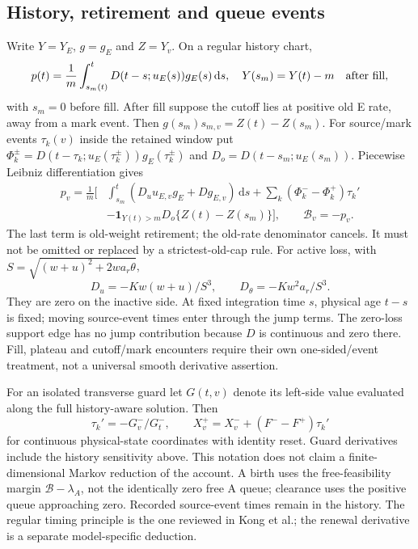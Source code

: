 \documentclass[11pt,a4paper]{article}
\newcommand{\dd}{\,\mathrm d}
\newcommand{\Bud}{\mathcal B}
\begin{document}
\subsection{History, retirement and queue events}
Write $Y=Y_E$, $g=g_E$ and $Z=Y_v$. On a regular history chart,
\begin{equation}
 p(t)=\frac1m\int_{s_m(t)}^tD(t-s;u_E(s))g_E(s)\dd s,
 \quad Y(s_m)=Y(t)-m\quad\hbox{after fill},
 \label{eq:history}
\end{equation}
with $s_m=0$ before fill. After fill suppose the cutoff lies at positive
old E rate, away from a mark event. Then
$g(s_m)s_{m,v}=Z(t)-Z(s_m)$. For source/mark events $\tau_k(v)$ inside
the retained window put
$\Phi_k^\pm=D(t-\tau_k;u_E(\tau_k^\pm))g_E(\tau_k^\pm)$ and
$D_o=D(t-s_m;u_E(s_m))$. Piecewise Leibniz differentiation gives
\begin{align}
 p_v=\frac1m\bigg[&\int_{s_m}^t(D_u u_{E,v}g_E+Dg_{E,v})\dd s
 +\sum_k(\Phi_k^- -\Phi_k^+)\tau_k'\nonumber\\
 &-\mathbf1_{Y(t)>m}D_o\{Z(t)-Z(s_m)\}\bigg],\qquad \Bud_v=-p_v.
 \label{eq:historysensitivity}
\end{align}
The last term is old-weight retirement; the old-rate denominator cancels.
It must not be omitted or replaced by a strictest-old-cap rule. For active
loss, with $S=\sqrt{(w+u)^2+2wa_r\theta}$,
\begin{equation}
 D_u=-Kw(w+u)/S^3,\qquad D_\theta=-Kw^2a_r/S^3.
 \label{eq:kernel}
\end{equation}
They are zero on the inactive side. At fixed integration time $s$, physical
age $t-s$ is fixed; moving source-event times enter through the jump terms.
The zero-loss support edge has no jump contribution because $D$ is continuous
and zero there. Fill, plateau and cutoff/mark encounters require their own
one-sided/event treatment, not a universal smooth derivative assertion.

For an isolated transverse guard let $G(t,v)$ denote its left-side value
evaluated along the full history-aware solution. Then
\begin{equation}
 \tau_k'=-G_v^-/G_t^-,\qquad
 X_v^+=X_v^-+(F^- -F^+)\tau_k'
 \label{eq:events}
\end{equation}
for continuous physical-state coordinates with identity reset. Guard
derivatives include the history sensitivity above. This notation does not
claim a finite-dimensional Markov reduction of the account. A birth uses
the free-feasibility margin $\Bud-\lambda_A$, not the identically zero
free A queue; clearance uses the positive queue approaching zero. Recorded
source-event times remain in the history. The regular timing principle is
the one reviewed in Kong et al.; the renewal derivative is a separate
model-specific deduction.
\end{document}
